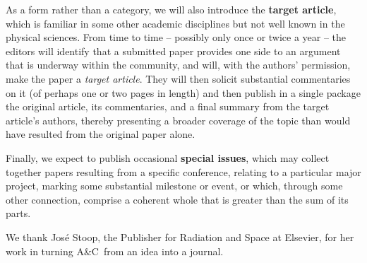 \documentclass[11pt,twoside]{article}
\newcommand{\ac}{A\&C}
\begin{document}
As a form rather than a category, we will also introduce the
\textbf{target article}, which is familiar in some other academic
disciplines but not well known in the physical sciences. From time to time -- possibly
only once or twice a year -- the editors will identify that a submitted paper 
provides one side to an argument that is underway within the community, and will,
with the authors' permission, make the paper a {\em target article\/}. They will then solicit 
substantial commentaries on it (of perhaps one or two pages in length) and then 
publish in a single package the original article, its commentaries, and a final summary
from the target article's authors, thereby presenting a broader coverage of the topic
than would have resulted from the original paper alone.  

Finally, we expect to publish occasional \textbf{special issues}, which may collect together
papers resulting from a specific conference, relating to a particular major project, marking some 
substantial milestone or event, or which, through some other connection, comprise a coherent whole 
that is greater than the sum of its parts.  



\acknowledgements We thank Jos{\'e} Stoop, the Publisher for Radiation and Space at Elsevier, for her work in turning \ac\ from an idea into a journal.


\end{document}

